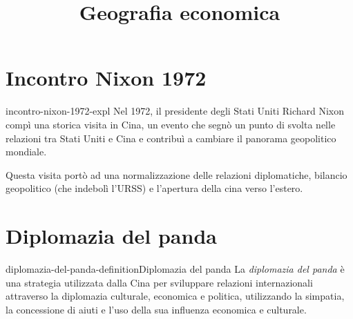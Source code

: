 \documentclass[preview]{standalone}
\begin{document}
\title{Geografia economica}
\genpage

\section{Incontro Nixon 1972}

\begin{snippet}{incontro-nixon-1972-expl}
    Nel 1972, il presidente degli Stati Uniti Richard Nixon compì
    una storica visita in Cina, un evento che segnò un punto di svolta nelle
    relazioni tra Stati Uniti e Cina e contribuì a cambiare il panorama geopolitico mondiale.

    Questa visita portò ad una normalizzazione delle relazioni diplomatiche,
    bilancio geopolitico (che indebolì l'URSS) e l'apertura della cina verso l'estero.
\end{snippet}

\section{Diplomazia del panda}

\begin{snippetdefinition}{diplomazia-del-panda-definition}{Diplomazia del panda}
    La \textit{diplomazia del panda} è una strategia utilizzata dalla Cina per sviluppare relazioni internazionali attraverso la diplomazia culturale, economica e politica, utilizzando la simpatia, la concessione di aiuti e l'uso della sua influenza economica e culturale.
\end{snippetdefinition}
\end{document}
